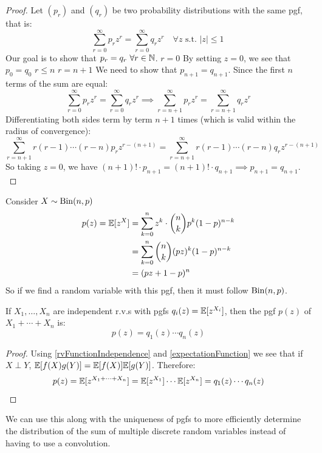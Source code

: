 \documentclass[../main.tex]{subfiles}
\begin{document}
\begin{proof}
  Let $(p_r)$ and $(q_r)$ be two probability distributions with the same pgf, that is:
  \[
    \sum_{r = 0}^{\infty} p_r z^{r} = \sum_{r = 0}^{\infty} q_r z^{r} \quad \forall z \text{ s.t. } |z| \leq 1\
  \]
  Our goal is to show that $p_r  = q_r\ \forall r \in \mathbb{N}$.
  \quietinduction
  {$r = 0$}{
    By setting $z = 0$, we see that $p_0 = q_0$ \tick
  }
  {$r \leq n$}{}
  {$r = n + 1$}{
    We need to show that $p_{n + 1} = q_{n + 1}$.
    Since the first $n$ terms of the sum are equal:
    \[
      \sum_{r = 0}^{\infty} p_r z^{r} = \sum_{r = 0}^{\infty} q_r z^{r} \implies \sum_{r = n + 1}^{\infty} p_r z^{r} = \sum_{r = n + 1}^{\infty} q_r z^{r}
    \]
    Differentiating both sides term by term $n + 1$ times (which is valid within the radius of convergence):
    \[
      \sum_{r = n + 1}^{\infty} r(r - 1) \cdots (r - n) p_r z^{r - (n + 1)} = \sum_{r = n + 1}^{\infty} r(r - 1) \cdots (r - n) q_r z^{r - (n + 1)}
    \]
    So taking $z = 0$, we have $(n + 1)! \cdot p_{n + 1} = (n + 1)! \cdot q_{n + 1} \implies p_{n + 1} = q_{n + 1}$.
  }
\end{proof}
\begin{example}
  Consider $X \sim \operatorname{Bin}(n, p)$
  \begin{align*}
    p(z) = \mathbb{E}[z^{X}] &= \sum_{k = 0}^{n} z^{k} \cdot \binom{n}{k} p^{k} (1 - p)^{n - k} \\
                     &= \sum_{k = 0}^{n} \binom{n}{k} (pz)^{k} (1 - p)^{n - k} \\
                     &= (pz + 1 - p)^{n}
  \end{align*}
  So if we find a random variable with this pgf, then it must follow $\operatorname{Bin}(n, p)$.
\end{example}
\begin{lemma}
  If $X_1, \ldots, X_n$ are independent r.v.s with pgfs $q_i(z) = \mathbb{E}[z^{X_i}]$, then the pgf $p(z)$ of $X_1 + \cdots + X_n$ is:
  \label{pgfProduct}
  \[
    p(z) = q_1(z) \cdots q_n(z)
  \]
\end{lemma}
\begin{proof}
  Using \cref{rvFunctionIndependence} and \cref{expectationFunction} we see that if $X \perp Y$, $\mathbb{E}[f(X)g(Y)] = \mathbb{E}[f(X)]\mathbb{E}[g(Y)]$.
  Therefore:
  \[
    p(z) = \mathbb{E}[z^{X_1 + \cdots + X_n}] = \mathbb{E}[z^{X_1}] \cdots \mathbb{E}[z^{X_n}] = q_1(z) \cdots q_n(z)
  \]
\end{proof}
\begin{remark}
  We can use this along with the uniqueness of pgfs to more efficiently determine the distribution of the sum of multiple discrete random variables instead of having to use a convolution.
\end{remark}
\end{document}
